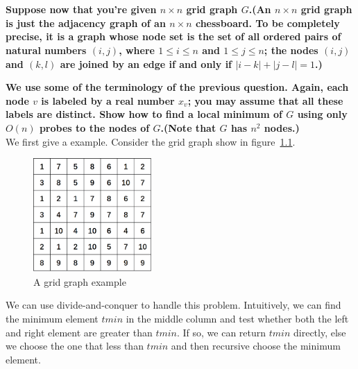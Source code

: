 
\chapter{}
\textbf{
Suppose now that you're given $n\times n$ grid graph $G$.(An $n\times n$ grid graph is just the adjacency graph of an $n\times n$ chessboard. To be completely precise, it is a graph whose node set is the set of all ordered pairs of natural numbers $(i,j)$, where $1\leq i \leq n$ and $1\leq j \leq n$; the nodes $(i,j)$ and $(k,l)$ are joined by an edge if and only if $|i-k|+|j-l|=1$.)
}

\textbf{
We use some of the terminology of the previous question. Again, each node $v$ is labeled by a real number $x_v$; you may assume that all these labels are distinct. Show how to find a local minimum of $G$ using only $O(n)$ probes to the nodes of $G$.(Note that $G$ has $n^2$ nodes.)
}
\hspace*{\fill} \\

We first give a example. Consider the grid graph show in figure~\ref{question_4_example}.
\\
\begin{figure}[h]
\centering
\includegraphics[width=0.4\textwidth]{figures/5.eps}
\caption{A grid graph example}\label{question_4_example}
\end{figure}

We can use divide-and-conquer to handle this problem. Intuitively, we can find the minimum element $tmin$ in the middle column and test whether both the left and right element are greater than $tmin$. If so, we can return $tmin$ directly, else we choose the one that less than $tmin$ and then recursive choose the minimum element.

